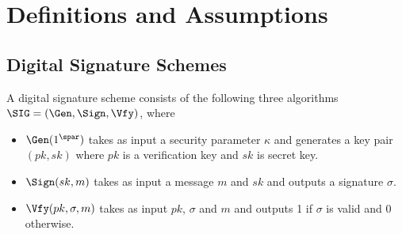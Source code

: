 \section{Definitions and Assumptions}\label{app:def}

\subsection{Digital Signature Schemes} \label{sec:signature}
A digital signature scheme consists of the following three algorithms $\SIG = (\Gen,\Sign,\Vfy)$, where
\begin{itemize}
 \item{$\Gen(1^{\spar})$ takes as input a security parameter $\kappa$ and generates a key pair $(pk, sk)$ where $pk$ is a verification key and $sk$ is secret key.}
 \item{$\Sign(sk, m)$ takes as input a message $m$ and $sk$ and outputs a signature $\sigma$.}
 \item{$\Vfy(pk,\sigma,m)$ takes as input $pk$, $\sigma$ and $m$ and outputs 1 if $\sigma$ is valid and 0 otherwise.}
\end{itemize}
